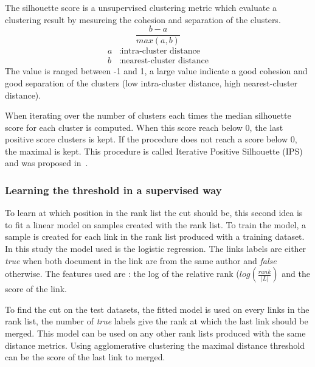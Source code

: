 \begin{definition}
  \label{def:silhouette}
  The silhouette score is a unsupervised clustering metric which evaluate a clustering result by mesureing the cohesion and separation of the clusters.
  \begin{equation}
    \frac{b - a}{max(a, b)}
  \end{equation}
  \begin{equation*}
    \begin{split}
      a&: \text{intra-cluster distance}\\
      b&: \text{nearest-cluster distance}
    \end{split}
  \end{equation*}
  The value is ranged between -1 and 1, a large value indicate a good cohesion and good separation of the clusters (low intra-cluster distance, high nearest-cluster distance).
\end{definition}

When iterating over the number of clusters each times the median silhouette score for each cluster is computed.
When this score reach below 0, the last positive score clusters is kept.
If the procedure does not reach a score below 0, the maximal is kept.
This procedure is called Iterative Positive Silhouette (IPS) and was proposed in~\cite{automated_unsupervised}.

\subsubsection{Learning the threshold in a supervised way}

To learn at which position in the rank list the cut should be, this second idea is to fit a linear model on samples created with the rank list.
To train the model, a sample is created for each link in the rank list produced with a training dataset.
In this study the model used is the logistic regression.
The links labels are either \textit{true} when both document in the link are from the same author and \textit{false} otherwise.
The features used are : the log of the relative rank ($log(\frac{rank}{|L|})$ and the score of the link.

To find the cut on the test datasets, the fitted model is used on every links in the rank list, the number of \textit{true} labels give the rank at which the last link should be merged.
This model can be used on any other rank lists produced with the same distance metrics.
Using agglomerative clustering the maximal distance threshold can be the score of the last link to merged.

